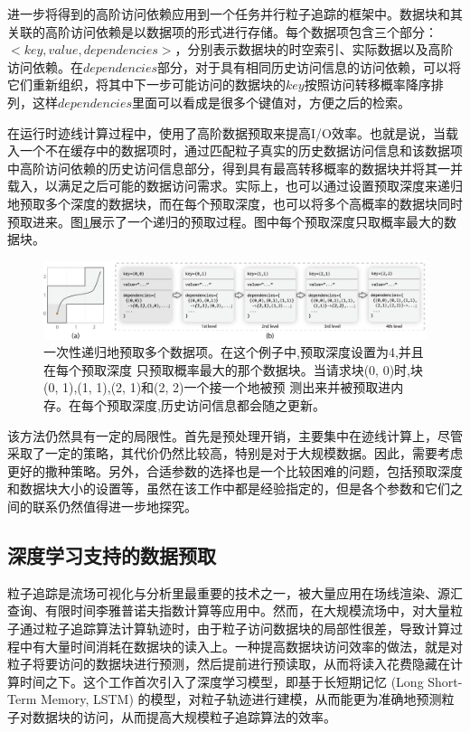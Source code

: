 进一步将得到的高阶访问依赖应用到一个任务并行粒子追踪的框架中。数据块和其关联的高阶访问依赖是以数据项的形式进行存储。每个数据项包含三个部分：$<key, value, dependencies>$，分别表示数据块的时空索引、实际数据以及高阶访问依赖。在$dependencies$部分，对于具有相同历史访问信息的访问依赖，可以将它们重新组织，将其中下一步可能访问的数据块的$key$按照访问转移概率降序排列，这样$dependencies$里面可以看成是很多个键值对，方便之后的检索。

在运行时迹线计算过程中，使用了高阶数据预取来提高I/O效率。也就是说，当载入一个不在缓存中的数据项时，通过匹配粒子真实的历史数据访问信息和该数据项中高阶访问依赖的历史访问信息部分，得到具有最高转移概率的数据块并将其一并载入，以满足之后可能的数据访问需求。实际上，也可以通过设置预取深度来递归地预取多个深度的数据块，而在每个预取深度，也可以将多个高概率的数据块同时预取进来。图\ref{fig:highorder_fig4}展示了一个递归的预取过程。图中每个预取深度只取概率最大的数据块。

\begin{figure}[!tb]
  \centering
  \includegraphics[width=\linewidth]{image/prefetch/highorder_fig4.png}
  \caption{
    一次性递归地预取多个数据项。\parencite{ZhangGY16}在这个例子中,预取深度设置为4,并且在每个预取深度 只预取概率最大的那个数据块。当请求块(0, 0)时,块(0, 1),(1, 1),(2, 1)和(2, 2)一个接一个地被预 测出来并被预取进内存。在每个预取深度,历史访问信息都会随之更新。
  }
  \label{fig:highorder_fig4}
\end{figure}


该方法仍然具有一定的局限性。首先是预处理开销，主要集中在迹线计算上，尽管采取了一定的策略，其代价仍然比较高，特别是对于大规模数据。因此，需要考虑更好的撒种策略。另外，合适参数的选择也是一个比较困难的问题，包括预取深度和数据块大小的设置等，虽然在该工作中都是经验指定的，但是各个参数和它们之间的联系仍然值得进一步地探究。

\subsection{深度学习支持的数据预取}
粒子追踪是流场可视化与分析里最重要的技术之一，被大量应用在场线渲染、源汇查询、有限时间李雅普诺夫指数计算等应用中。然而，在大规模流场中，对大量粒子通过粒子追踪算法计算轨迹时，由于粒子访问数据块的局部性很差，导致计算过程中有大量时间消耗在数据块的读入上。一种提高数据块访问效率的做法，就是对粒子将要访问的数据块进行预测，然后提前进行预读取，从而将读入花费隐藏在计算时间之下。这个工作\parencite{Hong2018LSTM}首次引入了深度学习模型，即基于长短期记忆 (Long Short-Term Memory, LSTM) 的模型，对粒子轨迹进行建模，从而能更为准确地预测粒子对数据块的访问，从而提高大规模粒子追踪算法的效率。

